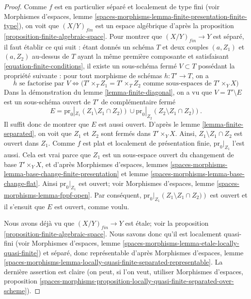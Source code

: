 \begin{proof}
Comme $f$ est en particulier séparé et localement de type fini (voir
Morphismes d'espaces,
lemme \ref{spaces-morphisms-lemma-finite-presentation-finite-type}),
on voit que $(X/Y)_{fin}$ est un espace algébrique d'après la
proposition \ref{proposition-finite-algebraic-space}.
Pour montrer que $(X/Y)_{fin} \to Y$ est séparé, il faut établir
ce qui suit : étant donnés un schéma $T$ et deux couples $(a, Z_1)$ et $(a, Z_2)$
au-dessus de $T$
ayant la même première composante et satisfaisant \ref{equation-finite-conditions},
il existe un sous-schéma fermé $V \subset T$ possédant la propriété suivante :
pour tout morphisme de schémas $h : T' \to T$, on a
$$
h \text{ se factorise par } V \Leftrightarrow
\Big(T' \times_T Z_1 = T' \times_T Z_2
\text{ comme sous-espaces de }T' \times_Y X\Big)
$$
Dans la démonstration du
lemme \ref{lemma-finite-diagonal},
on a vu que $V = T' \setminus E$ est un sous-schéma ouvert de $T'$
de complémentaire fermé
$$
E =
\text{pr}_0|_{Z_1}\left(Z_1 \setminus Z_1 \cap Z_2)\right)
\cup
\text{pr}_0|_{Z_2}\left(Z_2 \setminus Z_1 \cap Z_2)\right).
$$
Il suffit donc de montrer que $E$ est aussi ouvert. D'après le
lemme \ref{lemma-finite-separated},
on voit que $Z_1$ et $Z_2$ sont fermés dans $T' \times_Y X$. Ainsi,
$Z_1 \setminus Z_1 \cap Z_2$ est ouvert dans $Z_1$. Comme $f$ est plat et
localement de présentation finie, $\text{pr}_0|_{Z_1}$ l'est aussi.
Cela est vrai parce que $Z_1$ est un sous-espace ouvert du changement de base
$T' \times_Y X$, et d'après
Morphismes d'espaces,
lemmes \ref{spaces-morphisms-lemma-base-change-finite-presentation} et
lemme \ref{spaces-morphisms-lemma-base-change-flat}.
Ainsi $\text{pr}_0|_{Z_1}$ est ouvert; voir
Morphismes d'espaces, lemme \ref{spaces-morphisms-lemma-fppf-open}.
Par conséquent, $\text{pr}_0|_{Z_1}\left(Z_1 \setminus Z_1 \cap Z_2)\right)$ est
ouvert et il s'ensuit que $E$ est ouvert, comme voulu.

\medskip\noindent
Nous avons déjà vu que $(X/Y)_{fin} \to Y$ est étale; voir la
proposition \ref{proposition-finite-algebraic-space}.
Nous savons donc qu'il est localement quasi-fini (voir
Morphismes d'espaces,
lemme \ref{spaces-morphisms-lemma-etale-locally-quasi-finite})
et séparé, donc représentable d'après
Morphismes d'espaces, lemme
\ref{spaces-morphisms-lemma-locally-quasi-finite-separated-representable}.
La dernière assertion est claire (on peut, si l'on veut, utiliser
Morphismes d'espaces, proposition
\ref{spaces-morphisms-proposition-locally-quasi-finite-separated-over-scheme}).
\end{proof}

